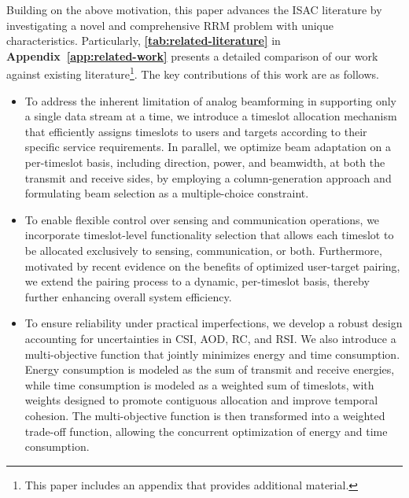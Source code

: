 \documentclass[10pt,journal,compsoc]{IEEEtran}
\theoremstyle{myremark}
\theoremstyle{myexample}
\begin{document}
 


Building on the above motivation, this paper advances the ISAC literature by investigating a novel and comprehensive \gls{RRM} problem with unique characteristics. Particularly, \textbf{\cref{tab:related-literature}} in \textbf{Appendix~\ref{app:related-work}} presents a detailed comparison of our work against existing literature\footnote{This paper includes an appendix that provides additional material.}. The key contributions of this work are as follows.
 

\begin{itemize}

	\item To address the inherent limitation of analog beamforming in supporting only a single data stream at a time, we introduce a timeslot allocation mechanism that efficiently assigns timeslots to users and targets according to their specific service requirements. In parallel, we optimize beam adaptation on a per-timeslot basis, including direction, power, and beamwidth, at both the transmit and receive sides, by employing a column-generation approach and formulating beam selection as a multiple-choice constraint.
	
	\item To enable flexible control over sensing and communication operations, we incorporate  timeslot-level functionality selection that allows each timeslot to be allocated exclusively to sensing, communication, or both. Furthermore, motivated by recent evidence on the benefits of optimized user-target pairing, we extend the pairing process to a dynamic, per-timeslot basis, thereby further enhancing overall system efficiency.
	
	\item To ensure reliability under practical imperfections, we develop a robust design accounting for uncertainties in \gls{CSI}, \gls{AOD}, \gls{RC}, and \gls{RSI}. We also introduce a multi-objective function that jointly minimizes energy and time consumption. Energy consumption is modeled as the sum of transmit and receive energies, while time consumption is modeled as a weighted sum of timeslots, with weights designed to promote contiguous allocation and improve temporal cohesion. The multi-objective function is then transformed into a weighted trade-off function, allowing the concurrent optimization of energy and time consumption.  
	

\end{itemize}
\end{document}
